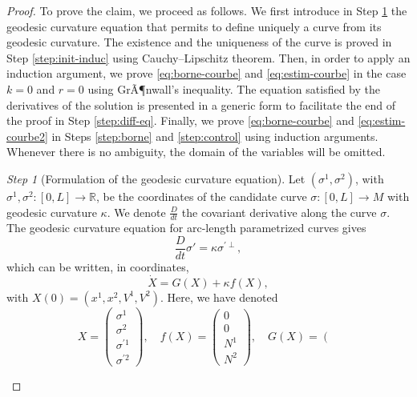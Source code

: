 \documentclass{article}
\newcommand{\R}{\mathbb{R}}
\newcommand{\surf}{M}
\newcommand{\ko}{\kappa}
\newcommand{\N}{\mathcal{N}}
\theoremstyle{remark}
\theoremstyle{prpart}
\newtheorem{proofpart}{Step}
\begin{document}
\begin{proof}
  To prove the claim, we proceed as follows. We first introduce in Step \ref{step:geod-eq} the geodesic curvature equation that permits to define uniquely a curve from its geodesic curvature. The existence and the uniqueness of the curve is proved in Step \ref{step:init-induc} using Cauchy--Lipschitz theorem. Then, in order to apply an induction argument, we prove \eqref{eq:borne-courbe} and \eqref{eq:estim-courbe} in the case $k=0$ and $r=0$ using GrÃ¶nwall's inequality. The equation satisfied by the derivatives of the solution is presented in a generic form to facilitate the end of the proof in Step \ref{step:diff-eq}. Finally, we prove \eqref{eq:borne-courbe} and \eqref{eq:estim-courbe2} in Steps \ref{step:borne} and \ref{step:control} using induction arguments. Whenever there is no ambiguity, the domain of the variables will be omitted.
  \begin{proofpart}[Formulation of the geodesic curvature equation]\label{step:geod-eq}
  Let $(\sigma^1,\sigma^2)$, with $\sigma^1,\sigma^2:[0,L]\to\R$, be the coordinates of the candidate curve $\sigma:[0,L]\to\surf$ with geodesic curvature $\ko$. %
 We denote $\frac{D}{dt}$ the covariant derivative along the curve $\sigma$. The geodesic curvature equation for arc-length parametrized curves gives
\begin{equation}
\label{eq:geod-curv}
  \frac{D}{dt}\sigma' = \ko\sigma^{\prime\perp},
\end{equation}
which can be written, in coordinates,
\begin{equation}
\label{eq:pr-edo}
  \dot X = G(X) + \ko f(X),
\end{equation}
with $X(0)=(x^1,x^2,V^1,V^2)$. Here, we have denoted
\small
\begin{equation*}
  X = 
\left(
\begin{array}{c}
\sigma^1\\\sigma^2\\\sigma^{\prime 1}\\\sigma^{\prime 2} 
\end{array}\right), \quad
f(X) = \left( 
  \begin{array}{c}
    0\\0\\N^1\\N^2
    \end{array} \right), \quad
G(X) = \left(
  \begin{array}{c}

\end{array}
\end{equation*}
\end{proofpart}
\end{proof}
\end{document}
